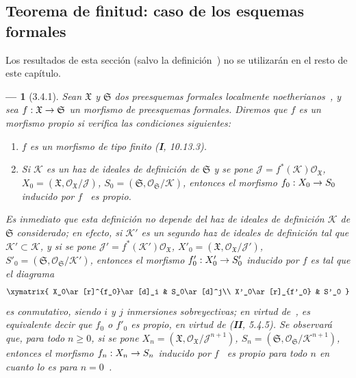 \documentclass[10pt,oneside,openany]{book}
\theoremstyle{egaenv}\newtheorem*{env}{---}
\theoremstyle{egastatement}
\theoremstyle{egadescription}
\newcommand{\oldpage}[2][]{\marginnote{\normalfont\scriptsize\textbf{#1}\,|\,#2}\ignorespaces}
\renewcommand{\geq}{\geqslant}
\renewcommand{\to}{\mathchoice{\longrightarrow}{\rightarrow}{\rightarrow}{\rightarrow}}
\begin{document}
\subsection{Teorema de finitud: caso de los esquemas formales}
\label{subsection:III.3.4}
\label{subsection:III.3.4-fr}

\oldpage[III]{119}
Los resultados de esta sección (salvo la definición~) no se utilizarán en el resto de este capítulo.

\begin{env}[3.4.1]
\label{III.3.4.1}
\label{III.3.4.1-fr}
Sean $\mathfrak X$ y $\mathfrak S$ dos preesquemas formales localmente noetherianos~, y sea $f:\mathfrak X\to\mathfrak S$ un morfismo de preesquemas formales.
Diremos que $f$ es un morfismo \emph{propio} si
verifica las condiciones siguientes:
\begin{enumerate}
\item[$1^\circ$] \emph{$f$ es un morfismo de tipo finito} (\textbf{I}, 10.13.3).
\item[$2^\circ$] \emph{Si $\mathcal K$ es un haz de ideales de definición de $\mathfrak S$ y se pone $\mathcal J=f^*(\mathcal K)\mathcal O_{\mathfrak X}$, $X_0=(\mathfrak X,\mathcal O_{\mathfrak X}/\mathcal J)$, $S_0=(\mathfrak S,\mathcal O_{\mathfrak S}/\mathcal K)$, entonces el morfismo $f_0:X_0\to S_0$ inducido por $f$~ es propio}.
\end{enumerate}
Es inmediato que esta definición no depende del haz de ideales de definición $\mathcal K$ de $\mathfrak S$ considerado; en efecto, si $\mathcal K'$ es un segundo haz de ideales de definición tal que $\mathcal K'\subset\mathcal K$, y si se pone $\mathcal J'=f^*(\mathcal K')\mathcal O_{\mathfrak X}$, $X'_0=(\mathfrak X,\mathcal O_{\mathfrak X}/\mathcal J')$, $S'_0=(\mathfrak S,\mathcal O_{\mathfrak S}/\mathcal K')$, entonces el morfismo $f'_0:X'_0\to S'_0$ inducido por $f$ es tal que el diagrama
\[
\xymatrix{
X_0\ar[r]^{f_0}\ar[d]_i & S_0\ar[d]^j\\
X'_0\ar[r]_{f'_0} & S'_0
}
\]
es conmutativo, siendo $i$ y $j$ inmersiones sobreyectivas; en virtud de~, es equivalente decir que $f_0$ o $f'_0$ es propio, en virtud de (\textbf{II}, 5.4.5). Se observará que, para todo $n\geq0$, si se pone $X_n=(\mathfrak X,\mathcal O_{\mathfrak X}/\mathcal J^{n+1})$, $S_n=(\mathfrak S,\mathcal O_{\mathfrak S}/\mathcal K^{n+1})$, entonces el morfismo $f_n:X_n\to S_n$ inducido por $f$~ es propio para todo $n$ en cuanto lo es para $n=0$~.


\end{env}
\end{document}
